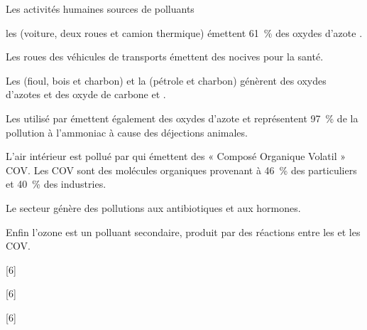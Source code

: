 \begin{doc}{Les activités humaines sources de polluants}
  \begin{listePoints}
    \item les  (voiture, deux roues et camion thermique) émettent \qty{61}{\percent} des oxydes d'azote .
    \item Les roues des véhicules de transports émettent des  nocives pour la santé.
    \item Les  (fioul, bois et charbon) et la  (pétrole et charbon) génèrent des oxydes d'azotes  et des oxyde de carbone  et \dioxydeDeCarbone.
    \item Les  utilisé par  émettent également des oxydes d'azote  et représentent \qty{97}{\percent} de la pollution à l'ammoniac \ammoniac à cause des déjections animales.
    \item L'air intérieur est pollué par  qui émettent des « Composé Organique Volatil » COV.
    Les COV sont des molécules organiques provenant à \qty{46}{\percent} des particuliers et \qty{40}{\percent} des industries.
    \item Le secteur  génère des pollutions aux antibiotiques et aux hormones.
    \item Enfin l'ozone est un polluant secondaire, produit par des réactions entre les  et les COV.
  \end{listePoints}
\end{doc}

[6]

[6]

[6]